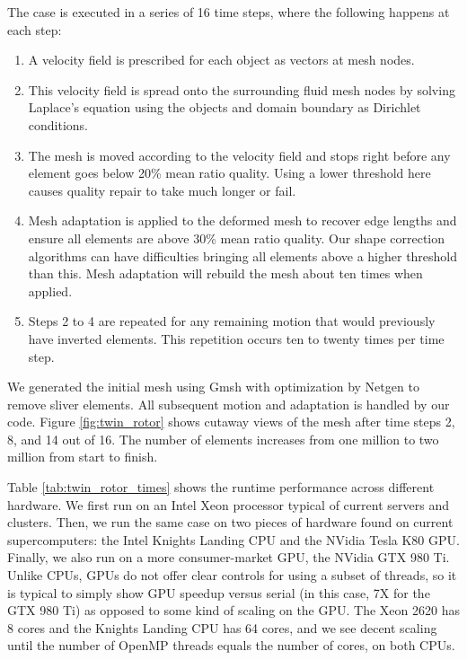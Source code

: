 The case is executed in a series of 16 time steps, where the
following happens at each step:
\begin{enumerate}
\item A velocity field is prescribed for each object as vectors
at mesh nodes.
\item This velocity field is spread onto the surrounding fluid
mesh nodes by solving Laplace's equation using the
objects and domain boundary as Dirichlet conditions.
\item The mesh is moved according to the velocity field
and stops right before any element goes below 20\% mean ratio quality.
Using a lower threshold here causes quality repair to take much longer
or fail.
\item Mesh adaptation is applied to the deformed mesh to
recover edge lengths and ensure all elements are above 30\%
mean ratio quality.
Our shape correction algorithms can have difficulties bringing
all elements above a higher threshold than this.
Mesh adaptation will rebuild the mesh about ten times when applied.
\item Steps 2 to 4 are repeated for any remaining motion
that would previously have inverted elements.
This repetition occurs ten to twenty times per time step.
\end{enumerate}
We generated the initial mesh
using Gmsh \cite{geuzaine2009gmsh} with optimization by Netgen
to remove sliver elements.
All subsequent motion and adaptation is handled by our code.
Figure \ref{fig:twin_rotor} shows cutaway views of the mesh
after time steps 2, 8, and 14 out of 16.
The number of elements increases from one million to two
million from start to finish.

Table \ref{tab:twin_rotor_times} shows the runtime performance across
different hardware.
We first run on an Intel Xeon processor typical of current servers
and clusters.
Then, we run the same case on two pieces of hardware found on
current supercomputers: the Intel Knights Landing CPU
and the NVidia Tesla K80 GPU.
Finally, we also run on a more consumer-market GPU,
the NVidia GTX 980 Ti.
Unlike CPUs, GPUs do not offer clear controls for using a subset
of threads, so it is typical to simply show GPU speedup versus
serial (in this case, 7X for the GTX 980 Ti) as opposed to some
kind of scaling on the GPU.
The Xeon 2620 has 8 cores and the Knights Landing CPU has
64 cores, and we see decent scaling until the number
of OpenMP threads equals the number of cores, on both CPUs.


